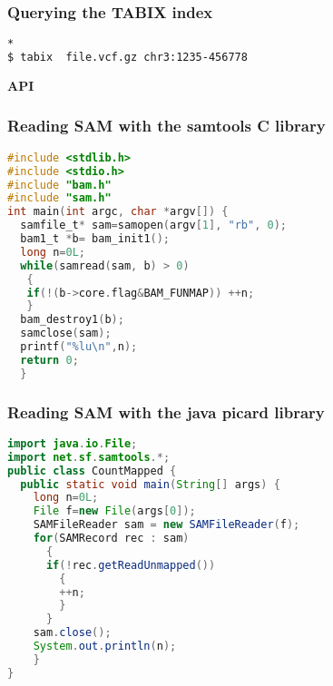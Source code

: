 \documentclass{beamer}
\newcommand{\centeredtitle}[1]{
\begin{center}
    \Huge{\bf{#1}}
\end{center}
}
\newcommand{\hugeslide}[1]{
\begin{frame}
\centeredtitle{#1}
\end{frame}
}
\begin{document}
\begin{frame}[fragile]
\frametitle{Querying the TABIX index}
\begin{lstlisting}[language=bash]*
$ tabix  file.vcf.gz chr3:1235-456778
\end{lstlisting}
\end{frame}

\hugeslide{API}

\begin{frame}[fragile]
\frametitle{Reading SAM with the samtools C library}

\begin{lstlisting}[language=C]
#include <stdlib.h>
#include <stdio.h>
#include "bam.h"
#include "sam.h"
int main(int argc, char *argv[]) {
  samfile_t* sam=samopen(argv[1], "rb", 0);
  bam1_t *b= bam_init1();
  long n=0L;
  while(samread(sam, b) > 0)
   {
   if(!(b->core.flag&BAM_FUNMAP)) ++n;
   }
  bam_destroy1(b);
  samclose(sam);
  printf("%lu\n",n);
  return 0;
  }
\end{lstlisting}
\end{frame}



\begin{frame}[fragile]
\frametitle{Reading SAM with the java picard library}

\begin{lstlisting}[language=java]
import java.io.File;
import net.sf.samtools.*;
public class CountMapped {
  public static void main(String[] args) {
    long n=0L;
    File f=new File(args[0]);
    SAMFileReader sam = new SAMFileReader(f);
    for(SAMRecord rec : sam)
      {
      if(!rec.getReadUnmapped())
      	{
      	++n;
      	}
      }
    sam.close();
    System.out.println(n);
    }
}
\end{lstlisting}
\end{frame}
\end{document}
